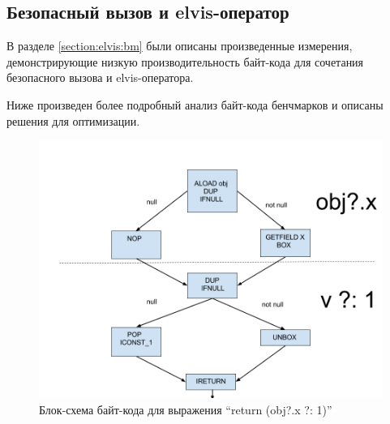 \subsection{Безопасный вызов и elvis-оператор}
\label{section:elvis:op}

В разделе \ref{section:elvis:bm} были описаны произведенные измерения, демонстрирующие низкую
производительность байт-кода для сочетания безопасного вызова и elvis-оператора.

Ниже произведен более подробный анализ байт-кода бенчмарков и описаны решения для оптимизации.

\begin{figure}
\begin{center}
    \includegraphics[scale=0.4]{../resources/safecall_elvis.png}
\end{center}
\caption{Блок-схема байт-кода для выражения ``return (obj?.x ?: 1)''}
\label{sc:elvis}
\end{figure}


